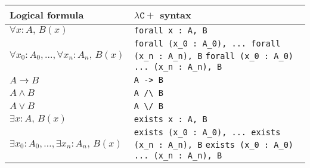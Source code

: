 \documentclass[convert={density=500}, border=2pt, varwidth=8in]{standalone}
\begin{document}
\begin{tabularx}{\textwidth}{|X|X|}
 \hline
 Logical formula & $\mathtt{\lambda C+}$ syntax \\ 
 \hline
 $\forall x : A, \, B(x)$ & \verb|forall x : A, B| \\ 
 \hline
 $\forall x_0 : A_0, \dots, \forall x_n : A_n, \, B(x)$ & 
  \verb|forall (x_0 : A_0), ... forall (x_n : A_n), B| \newline
  \verb|forall (x_0 : A_0) ... (x_n : A_n), B |
  \\ 
 \hline
 $A \rightarrow B$  & \texttt{A -> B} \\ 
 \hline
 $A \wedge B$ & \verb|A /\ B| \\ 
 \hline
 $A \vee B$ & \verb|A \/ B| \\ 
 \hline
 $\exists x : A, \, B(x)$ & \verb|exists x : A, B| \\ 
 \hline
 $\exists x_0 : A_0, \dots, \exists x_n : A_n, \, B(x)$ & 
  \verb|exists (x_0 : A_0), ... exists (x_n : A_n), B| \newline
  \verb|exists (x_0 : A_0) ... (x_n : A_n), B|
  \\ 
  \hline
\end{tabularx}
\end{document}
